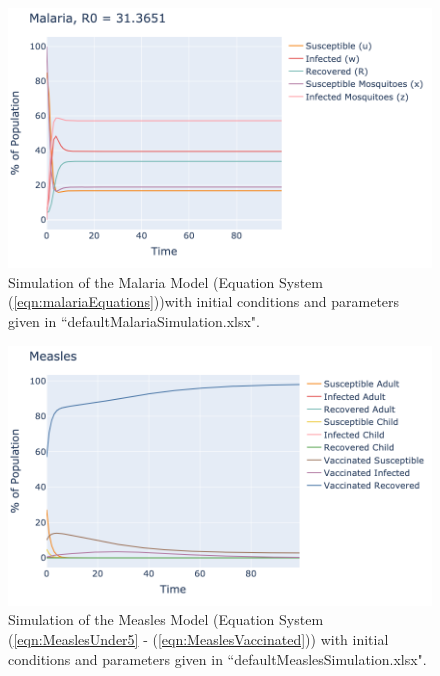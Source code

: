 \documentclass[letter,12pt, usenames,dvipsnames]{article}
\begin{document}
\begin{figure}[h!]
    \centering
    \includegraphics[width = .9\textwidth]{MalariaRun.png}
    \caption{Simulation of the Malaria Model (Equation System (\ref{eqn:malariaEquations}))with initial conditions and parameters given in ``defaultMalariaSimulation.xlsx".}
    \label{fig:my_label}
\end{figure}

\begin{figure}[h!]
    \centering
    \includegraphics[width = .9\textwidth]{MeaslesRun.png}
    \caption{Simulation of the Measles Model (Equation System (\ref{eqn:MeaslesUnder5} - (\ref{eqn:MeaslesVaccinated})) with initial conditions and parameters given in ``defaultMeaslesSimulation.xlsx".}
    \label{fig:my_label}
\end{figure}
\end{document}
